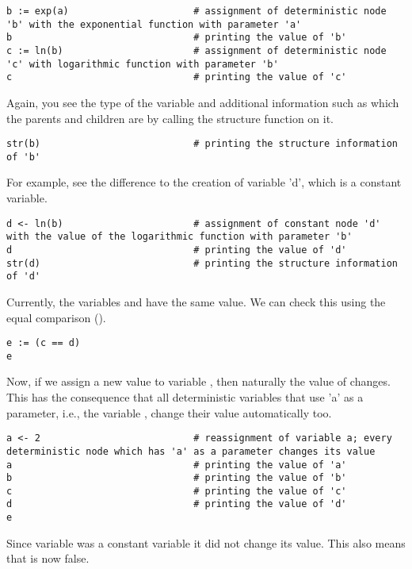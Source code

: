 {\tt \begin{snugshade*}
\begin{lstlisting}    
b := exp(a)                      # assignment of deterministic node 'b' with the exponential function with parameter 'a'
b                                # printing the value of 'b'
c := ln(b)                       # assignment of deterministic node 'c' with logarithmic function with parameter 'b'
c                                # printing the value of 'c'
\end{lstlisting}
\end{snugshade*}}
Again, you see the type of the variable and additional information such as which the parents and children are by calling the structure function on it.
{\tt \begin{snugshade*}
\begin{lstlisting}    
str(b)                           # printing the structure information of 'b'
\end{lstlisting}
\end{snugshade*}}
For example, see the difference to the creation of variable 'd', which is a constant variable.
{\tt \begin{snugshade*}
\begin{lstlisting}    
d <- ln(b)                       # assignment of constant node 'd' with the value of the logarithmic function with parameter 'b'
d                                # printing the value of 'd'
str(d)                           # printing the structure information of 'd'
\end{lstlisting}
\end{snugshade*}}
Currently, the variables  and  have the same value. 
We can check this using the equal comparison (\cl{==}).
{\tt \begin{snugshade*}
\begin{lstlisting}    
e := (c == d)			
e
\end{lstlisting}
\end{snugshade*}}
Now, if we assign a new value to variable , then naturally the value of  changes. 
This has the consequence that all deterministic variables that use 'a' as a parameter, i.e., the variable , change their value automatically too.
{\tt \begin{snugshade*}
\begin{lstlisting}    
a <- 2                           # reassignment of variable a; every deterministic node which has 'a' as a parameter changes its value
a                                # printing the value of 'a'
b                                # printing the value of 'b'
c                                # printing the value of 'c'
d                                # printing the value of 'd'
e
\end{lstlisting}
\end{snugshade*}}
Since variable  was a constant variable it did not change its value. 
This also means that  is now false.

